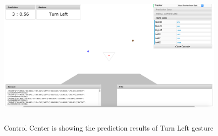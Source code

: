 \begin{figure}
	[h] \centering 
	\includegraphics[height=70mm]{figures/result/cc-turn-left.png} \caption{Control Center is showing the prediction results of Turn Left gesture}
	\label{res:cc:turn:left} 
\end{figure}
